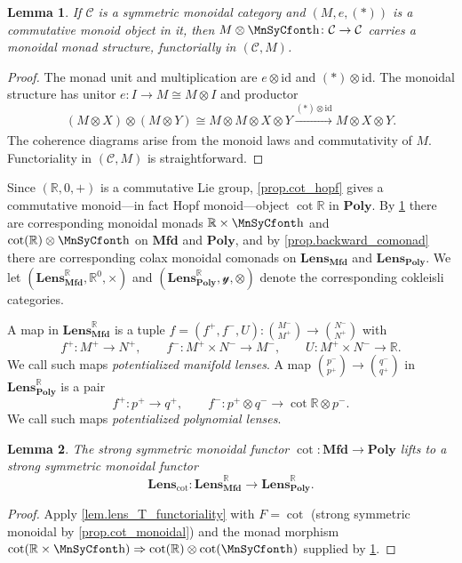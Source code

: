 \documentclass[11pt, oneside, article]{memoir}
\theoremstyle{definition}
\theoremstyle{plain}
\newtheorem{lemma}[lemma]{Lemma}
\newcommand{\cat}[1]{\mathcal{#1}}%
\newcommand{\Cat}[1]{\mathbf{#1}}%
\newcommand{\id}{\mathrm{id}}
\newcommand{\To}[2][]{\xrightarrow[#1]{#2}}
\newcommand{\rr}{\mathbb{R}}
\newcommand{\yon}{\mathcal{y}}
\newcommand{\poly}{\Cat{Poly}}
\newcommand{\mfd}{\Cat{Mfd}}
\newcommand{\Lens}[1]{\Cat{Lens}_{#1}}
\newcommand{\lmfd}{\Lens{\mfd}}
\newcommand{\inpt}[1]{#1^{-}}
\newcommand{\outp}[1]{#1^{+}}
\newcommand{\lensob}[1]{\binom{\inpt{#1}}{\outp{#1}}}%
\newcommand{\smallsquare}{\mbox{\MnSyCfont\symbol{"68}}}
\newcommand{\blank}{\mathord{\smallsquare}}
\begin{document}
\begin{lemma}\label{lemma.monoid_to_monad}
If $\cat{C}$ is a symmetric monoidal category and $(M,e,(*))$ is a commutative monoid object in it, then $M\otimes\blank\colon\cat{C}\to\cat{C}$ carries a monoidal monad structure, functorially in $(\cat C,M)$.
\end{lemma}

\begin{proof}
The monad unit and multiplication are $e\otimes\id$ and $(*)\otimes\id$. The monoidal structure has unitor $e\colon I\to M\cong M\otimes I$ and productor
\begin{equation}\label{eqn.monoid_productor}
(M\otimes X)\otimes(M\otimes Y)\cong M\otimes M\otimes X\otimes Y\To{(*)\otimes\id}M\otimes X\otimes Y.
\end{equation}
The coherence diagrams arise from the monoid laws and commutativity of $M$. Functoriality in $(\cat C,M)$ is straightforward.
\end{proof}

Since $(\rr,0,+)$ is a commutative Lie group, \cref{prop.cot_hopf} gives a commutative monoid---in fact Hopf monoid---object $\cot{\rr}$ in $\poly$. By \cref{lemma.monoid_to_monad} there are corresponding monoidal monads $\rr\times\blank$ and $\cot{\rr}\otimes\blank$ on $\mfd$ and $\poly$, and by \cref{prop.backward_comonad} there are corresponding colax monoidal comonads on $\Lens{\mfd}$ and $\Lens{\poly}$. We let $(\Lens{\mfd}^\rr,\rr^0,\times)$ and $(\Lens{\poly}^\rr,\yon,\otimes)$ denote the corresponding cokleisli categories.

A map in $\lmfd^\rr$ is a tuple $f=(\outp f,\inpt f,U)\colon\lensob M\to\lensob N$ with
\[
\outp f\colon\outp M\to\outp N,\qquad
\inpt f\colon\outp M\times\inpt N\to\inpt M,\qquad
U\colon\outp M\times\inpt N\to\rr.
\]
We call such maps \emph{potentialized manifold lenses}.
A map $\lensob p\to\lensob q$ in $\Lens{\poly}^\rr$ is a pair
\[
\outp f\colon\outp p\to\outp q,\qquad
\inpt f\colon\outp p\otimes\inpt q\to\cot{\rr}\otimes\inpt p.
\]
We call such maps \emph{potentialized polynomial lenses}.

\begin{lemma}\label{lem.cot_lifts_lens_potential}
The strong symmetric monoidal functor $\cot\colon\mfd\to\poly$ lifts to a strong symmetric monoidal functor
\[
\Lens\cot\colon\lmfd^\rr\to\Lens{\poly}^\rr.
\]
\end{lemma}

\begin{proof}
Apply \cref{lem.lens_T_functoriality} with $F=\cot$ (strong symmetric monoidal by \cref{prop.cot_monoidal}) and the monad morphism $\cot{\rr\times\blank}\Rightarrow\cot{\rr}\otimes\cot{\blank}$ supplied by \cref{lemma.monoid_to_monad}.
\end{proof}
\end{document}
